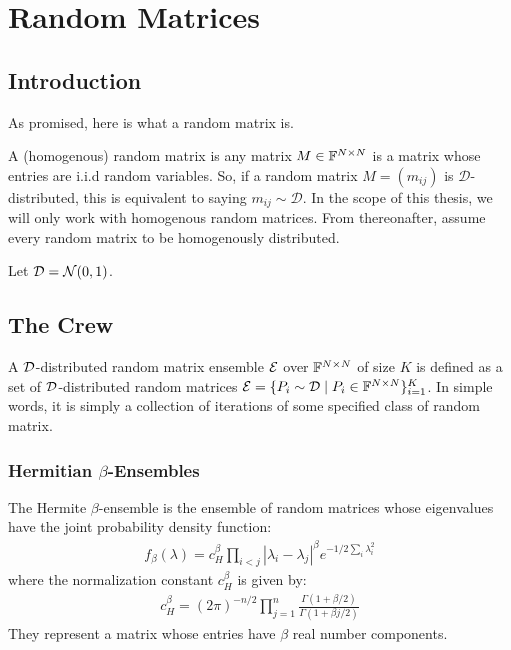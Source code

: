 \chapter{Random Matrices}

\section{Introduction}
As promised, here is what a random matrix is.

\begin{definition}
A (homogenous) random matrix is any matrix $M \in \mathbb{F}^{N \times N}$ is a matrix whose entries are i.i.d random variables. So, if a random matrix $M = (m_{ij})$ is $\mathcal{D}$-distributed, this is equivalent to saying $m_{ij} \sim \mathcal{D}$. In the scope of this thesis, we will only work with homogenous random matrices. From thereonafter, assume every random matrix to be homogenously distributed. 
\end{definition}

\begin{example}
Let $\mathcal{D} = \mathcal{N}(0,1)$. 
\end{example}

\section{The Crew}

\begin{definition}
A $\mathcal{D}$-distributed random matrix ensemble $\mathcal{E}$ over $\mathbb{F}^{N \times N}$ of size $K$ is defined as a set of $\mathcal{D}$-distributed random matrices $\mathcal{E} = \{P_i \sim \mathcal{D} \mid P_i \in \mathbb{F}^{N \times N}\}_{i = 1}^K$. In simple words, it is simply a collection of iterations of some specified class of random matrix.
\end{definition}

\subsection{Hermitian $\beta$-Ensembles}

\begin{definition}
The Hermite $\beta$-ensemble is the ensemble of random matrices whose eigenvalues have the joint probability density function:
\begin{align*}
f_\beta(\lambda) = c_H^\beta \prod_{i < j} |\lambda_i - \lambda_j|^\beta e^{-1/2\sum_i \lambda_i^2}
\end{align*}
where the normalization constant $c_H^\beta$ is given by:
\begin{align*}
c_H^\beta = (2\pi)^{-n/2} \prod_{j = 1}^n \frac{\Gamma(1 + \beta/2)}{\Gamma(1 + \beta j/2)}
\end{align*}
They represent a matrix whose entries have $\beta$ real number components.
\end{definition}

